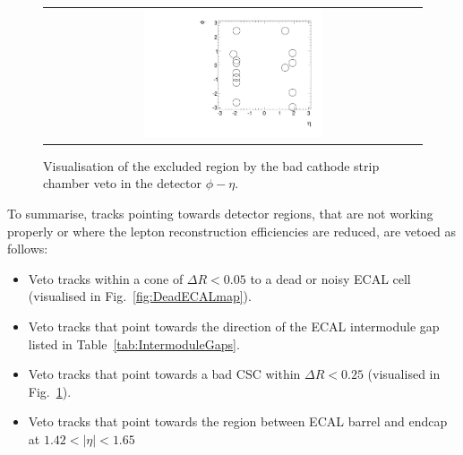 \begin{figure}[!b]
  \centering 
  \begin{tabular}{c}
    \includegraphics[width=0.49\textwidth]{figures/analysis/AnalysisSelection/BadCSCMap2.pdf}
  \end{tabular}
  \caption{Visualisation of the excluded region by the bad cathode strip chamber veto in the detector $\phi - \eta$.}
  \label{fig:BadCSCMap}
\vspace{30pt}
\end{figure}

To summarise, tracks pointing towards detector regions, that are not working properly or where the lepton reconstruction efficiencies are reduced, are vetoed as follows:
\begin{itemize}
\renewcommand{\labelitemi}{\footnotesize{\ding{118}}}
\item Veto tracks within a cone of $\Delta R<0.05$ to a dead or noisy ECAL cell (visualised in Fig.~\ref{fig:DeadECALmap}).
\item Veto tracks that point towards the direction of the ECAL intermodule gap listed in Table~\ref{tab:IntermoduleGaps}.
\item Veto tracks that point towards a bad CSC within $\Delta R<0.25$ (visualised in Fig.~\ref{fig:BadCSCMap}).
\item Veto tracks that point towards the region between ECAL barrel and endcap at $1.42<|\eta|<1.65$\\
\end{itemize}



